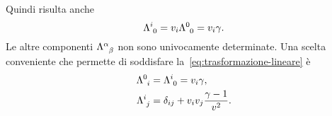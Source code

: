 Quindi risulta anche
\begin{equation}
  \tensor{\Lambda}{^{i}_{0}} = v_{i}\tensor{\Lambda}{^{0}_{0}} = v_{i}\gamma.
\end{equation}
Le altre componenti $\tensor{\Lambda}{^{\alpha}_{\beta}}$ non sono univocamente
determinate.  Una scelta conveniente che permette di soddisfare
la~\eqref{eq:trasformazione-lineare} è
\begin{align}
  \tensor{\Lambda}{^{0}_{i}} &= \tensor{\Lambda}{^{i}_{0}} = v_{i}\gamma, \\
  \tensor{\Lambda}{^{i}_{j}} &= \delta_{ij} + v_{i}v_{j}\frac{\gamma-1}{v^{2}}.
\end{align}


